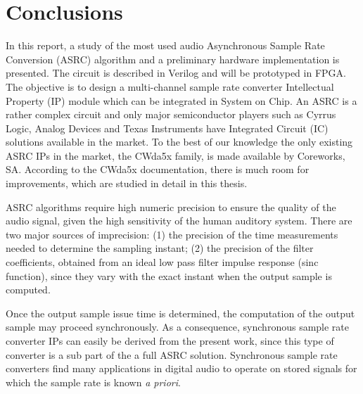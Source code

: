 
\chapter{Conclusions}
\label{chapter:conclusions}

In this report, a study of the most used audio Asynchronous Sample Rate
Conversion (ASRC) algorithm and a preliminary hardware implementation is
presented. The circuit is described in Verilog and will be prototyped in
FPGA. The objective is to design a multi-channel sample rate converter
Intellectual Property (IP) module which can be integrated in System on Chip. An
ASRC is a rather complex circuit and only major semiconductor players such as
Cyrrus Logic, Analog Devices and Texas Instruments have Integrated Circuit (IC)
solutions available in the market. To the best of our knowledge the only
existing ASRC IPs in the market, the CWda5x family, is made available by
Coreworks, SA. According to the CWda5x documentation, there is much room for
improvements, which are studied in detail in this thesis.

ASRC algorithms require high numeric precision to ensure the quality of the
audio signal, given the high sensitivity of the human auditory system. There are
two major sources of imprecision: (1) the precision of the time measurements
needed to determine the sampling instant; (2) the precision of the filter
coefficients, obtained from an ideal low pass filter impulse response (sinc
function), since they vary with the exact instant when the output sample is
computed.

Once the output sample issue time is determined, the computation of the output
sample may proceed synchronously. As a consequence, synchronous sample rate
converter IPs can easily be derived from the present work, since this type of
converter is a sub part of the a full ASRC solution. Synchronous sample rate
converters find many applications in digital audio to operate on stored signals
for which the sample rate is known \textit{a priori}.

